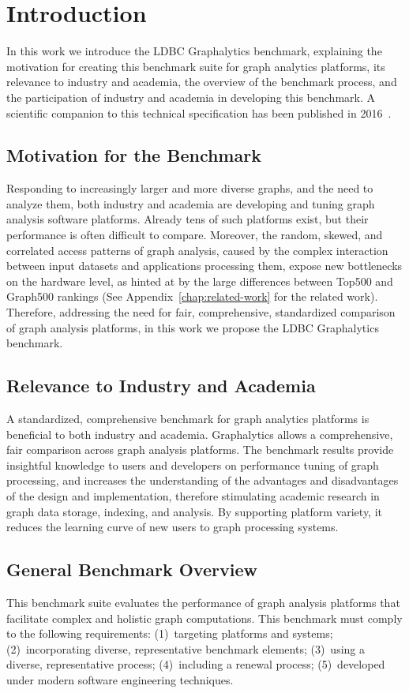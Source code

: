 \chapter{Introduction}
\label{chap:introduction}
In this work we introduce the LDBC Graphalytics benchmark, explaining the motivation for creating this benchmark suite for graph analytics platforms, its relevance to industry and academia, the overview of the benchmark process, and the participation of industry and academia in developing this benchmark. A scientific companion to this technical specification has been published in 2016~\cite{DBLP:journals/pvldb/IosupHNHPMCCSATXNB16}.

\section{Motivation for the Benchmark}
Responding to increasingly larger and more diverse graphs, and the need to analyze them, both industry and academia are developing and tuning graph analysis software platforms. Already tens of such platforms exist,	but their performance is often difficult to compare. Moreover, the random, skewed, and correlated access patterns of graph analysis, caused by the complex interaction between input datasets and applications processing them, expose new bottlenecks on the hardware level, as hinted at by the large differences between Top500 and Graph500 rankings (See Appendix~\ref{chap:related-work} for the related work). Therefore, addressing the need for fair, comprehensive, standardized comparison of graph analysis platforms, in this work we propose the LDBC Graphalytics benchmark.

\section{Relevance to Industry and Academia}
A standardized, comprehensive benchmark for graph analytics platforms is beneficial to both industry and academia. Graphalytics allows a comprehensive, fair comparison across graph analysis platforms. The benchmark results provide insightful knowledge to users and developers on performance tuning of graph processing, and increases the understanding of the advantages and disadvantages of the design and implementation, therefore stimulating academic research in graph data storage, indexing, and analysis. By supporting platform variety, it reduces the learning curve of new users to graph processing systems.

\section{General Benchmark Overview}
This benchmark suite evaluates the performance of graph analysis platforms that facilitate complex and holistic graph computations. This benchmark must comply to the following requirements: (1)~targeting platforms and systems; (2)~incorporating diverse, representative benchmark elements; (3)~using a diverse, representative process; (4)~including a renewal process; (5)~developed under modern software engineering techniques.

